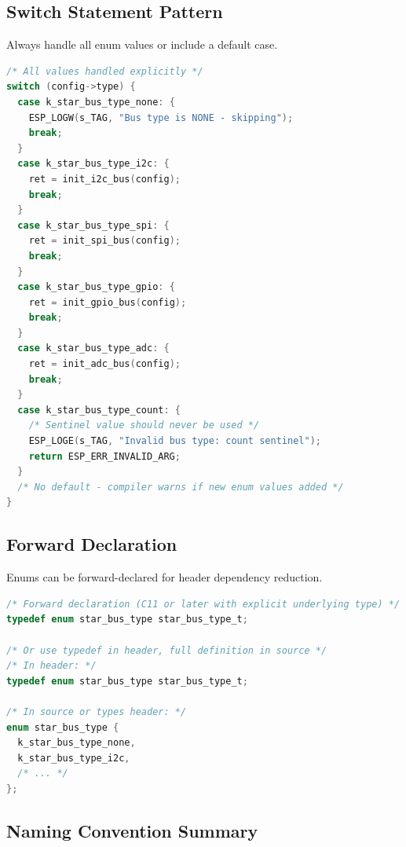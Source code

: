 \subsection{Switch Statement Pattern}

Always handle all enum values or include a default case.

\begin{lstlisting}[language=C]
/* All values handled explicitly */
switch (config->type) {
  case k_star_bus_type_none: {
    ESP_LOGW(s_TAG, "Bus type is NONE - skipping");
    break;
  }
  case k_star_bus_type_i2c: {
    ret = init_i2c_bus(config);
    break;
  }
  case k_star_bus_type_spi: {
    ret = init_spi_bus(config);
    break;
  }
  case k_star_bus_type_gpio: {
    ret = init_gpio_bus(config);
    break;
  }
  case k_star_bus_type_adc: {
    ret = init_adc_bus(config);
    break;
  }
  case k_star_bus_type_count: {
    /* Sentinel value should never be used */
    ESP_LOGE(s_TAG, "Invalid bus type: count sentinel");
    return ESP_ERR_INVALID_ARG;
  }
  /* No default - compiler warns if new enum values added */
}
\end{lstlisting}

\subsection{Forward Declaration}

Enums can be forward-declared for header dependency reduction.

\begin{lstlisting}[language=C]
/* Forward declaration (C11 or later with explicit underlying type) */
typedef enum star_bus_type star_bus_type_t;

/* Or use typedef in header, full definition in source */
/* In header: */
typedef enum star_bus_type star_bus_type_t;

/* In source or types header: */
enum star_bus_type {
  k_star_bus_type_none,
  k_star_bus_type_i2c,
  /* ... */
};
\end{lstlisting}

\subsection{Naming Convention Summary}

